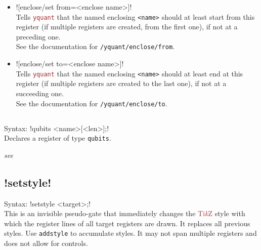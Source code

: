 \documentclass{scrartcl}
\def\TikZ{\textcolor{brown}{Ti\textit kZ}}
\def\pkg#1{\textcolor{brown}{\texttt{#1}}}
\def\ttlink{\link\texttt}
\def\texlink{\link\tex}
\def\yquantlink{\link\yquant}
\def\Yquant{\pkg{yquant}}
\begin{document}
\begin{itemize}
               Inside the value, \texlink{\reg} expands to \texttt{<name>}, \texlink{\len} expands to \texttt{<len>}, \texlink{\idx} expands to the current index within the vector register (for new registers, $\text{\ttlink{/yquant/idx base}} \leq \text{\tex!\idx!} < \text{\texttt{<len>}} + \text{\ttlink{/yquant/idx base}}$), and \texlink{\regidx} expands to \texlink{\reg} if \texttt{<len>} is one, or to \tex!\reg[\idx]! else.
               For details about these macros and changes in version~0.8, see their documentation.
            \item \yquant![enclose/set from=<enclose name>]! \\
               Tells \Yquant{} that the named enclosing \texttt{<name>} should at least start from this register (if multiple registers are created, from the first one), if not at a preceding one. \\
               See the documentation for \ttlink{/yquant/enclose/from}.
            \item \yquant![enclose/set to=<enclose name>]! \\
               Tells \Yquant{} that the named enclosing \texttt{<name>} should at least end at this register (if multiple registers are created to the last one), if not at a succeeding one. \\
               See the documentation for \ttlink{/yquant/enclose/to}.
         \end{itemize}

      \subsection{\texorpdfstring{}{qubits}}
         Syntax: \yquant!qubits <name>[<len>];! \\
         Declares a register of type \texttt{qubits}.

         \emph{see \yquantlink{qubit}}

      \subsection[\texorpdfstring{\yquant{setstyle}}{setstyle}]{\yquant!setstyle!}
         Syntax: \yquant!setstyle <target>;! \\
         This is an invisible pseudo\hyp gate that immediately changes the \TikZ{} style with which the register lines of all target registers are drawn.
         It replaces all previous styles.
         Use \ttlink{addstyle} to accumulate styles.
         It may not span multiple registers and does not allow for controls.
\end{document}
